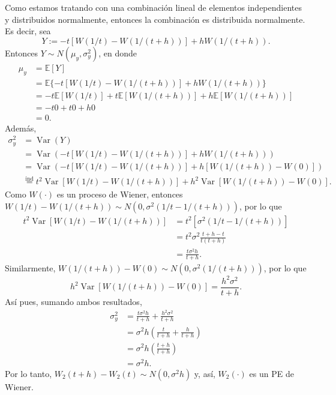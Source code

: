 \documentclass[12pt]{article}
\newcommand{\E}{\mathbb{E}}
\DeclareMathOperator{\Var}{Var}
\begin{document}
Como estamos tratando con una combinación lineal de elementos independientes y distribuidos normalmente, entonces la combinación es distribuida normalmente. Es decir, sea 
\[Y := -t [ W(1/t) - W(1/(t+h)) ] + hW(1/(t+h)). \]
Entonces $Y \sim N(\mu_y, \sigma_y^2)$, en donde
\begin{align*}
    \mu_y &= \E[Y] \\
    &= \E\{-t [ W(1/t) - W(1/(t+h)) ] + hW(1/(t+h))\} \\
    &= -t \E[W(1/t)] + t\E[W(1/(t+h))] + h\E[W(1/(t+h))] \\
    &= -t0 + t0 + h0 \\
    &= 0.
\end{align*}
Además,
\begin{align*}
    \sigma_y^2 &= \Var(Y) \\
    &= \Var(-t [ W(1/t) - W(1/(t+h)) ] + hW(1/(t+h))) \\
    &= \Var(-t [ W(1/t) - W(1/(t+h)) ] + h[W(1/(t+h))-W(0)]) \\
    &\overset{\mathrm{ind}}{=} t^2\Var[ W(1/t) - W(1/(t+h)) ] + h^2\Var[W(1/(t+h))-W(0)].
\end{align*}
Como $W(\cdot)$ es un proceso de Wiener, entonces $W(1/t) - W(1/(t+h)) \sim N(0, \sigma^2(1/t - 1/(t+h)))$, por lo que
\begin{align*}
    t^2\Var[ W(1/t) - W(1/(t+h)) ] &= t^2[\sigma^2(1/t - 1/(t+h))] \\
    &= t^2\sigma^2 \frac{t+h-t}{t(t+h)}  \\
    &= \frac{t \sigma^2 h}{t+h}.
\end{align*}
Similarmente, $W(1/(t+h))-W(0) \sim N(0, \sigma^2 (1/(t+h)))$, por lo que
\[ h^2\Var[W(1/(t+h))-W(0)] = \frac{h^2 \sigma^2}{t+h}. \]
Así pues, sumando ambos resultados,
\begin{align*}
    \sigma_y^2 &= \frac{t \sigma^2 h}{t+h} + \frac{h^2 \sigma^2}{t+h} \\
    &= \sigma^2h \left(\frac{t}{t+h} + \frac{h}{t+h} \right) \\
    &= \sigma^2h \left(\frac{t+h}{t+h} \right) \\
    &= \sigma^2h.
\end{align*}
Por lo tanto,  $W_2(t+h) - W_2(t) \sim N(0, \sigma^2 h)$ y, así, $W_2(\cdot)$ es un PE de Wiener.
\end{document}
